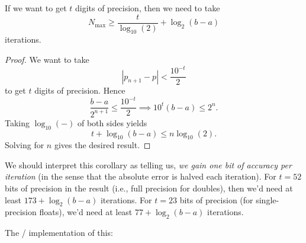 \begin{cor}
  If we want to get $t$ digits of precision, then we need to take
  \begin{equation*}
    N_{\text{max}}\geq \frac{t}{\log_{10}(2)} + \log_{2}(b-a)
  \end{equation*}
  iterations.
\end{cor}
\begin{proof}
  We want to take
  \begin{equation}
    |p_{n+1} - p| < \frac{10^{-t}}{2}
  \end{equation}
  to get $t$ digits of precision. Hence
  \begin{equation}
    \frac{b-a}{2^{n+1}}\leq\frac{10^{-t}}{2}\implies 10^{t}(b-a)\leq 2^{n}.
  \end{equation}
  Taking $\log_{10}(-)$ of both sides yields
  \begin{equation}
    t + \log_{10}(b-a)\leq n \log_{10}(2).
  \end{equation}
  Solving for $n$ gives the desired result.
\end{proof}

\begin{rmk}
  We should interpret this corollary as telling us, \emph{we gain one
  bit of accuracy per iteration} (in the sense that the absolute error
  is halved each iteration).
  For $t=52$ bits of precision in the result (i.e., full precision for
  doubles), then we'd need at least $173 + \log_{2}(b-a)$ iterations.
  For $t=23$ bits of precision (for single-precision floats), we'd need
  at least $77 + \log_{2}(b-a)$ iterations.
\end{rmk}

\begin{chunk}
  The \FORTRAN/ implementation of this:
  
\end{chunk}


